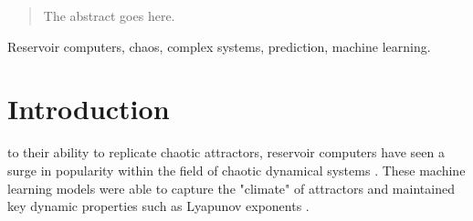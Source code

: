 \documentclass[journal]{journal}
\begin{document}






\maketitle
\thispagestyle{empty}


\begin{abstract}
The abstract goes here.
\end{abstract}

\begin{IEEEkeywords}
Reservoir computers, chaos, complex systems, prediction, machine learning.
\end{IEEEkeywords}






%
\IEEEpeerreviewmaketitle



\section{Introduction}
% 
% 
% 
% 
 to their ability to replicate chaotic attractors, reservoir computers have seen a surge in popularity within the field of chaotic dynamical systems \cite{Pathak2018Phys, Pathak2018Chaos, Vlachas2020}. These machine learning models were able to capture the "climate" of attractors and maintained key dynamic properties such as Lyapunov exponents \cite{Ott2018}. 
\end{document}
